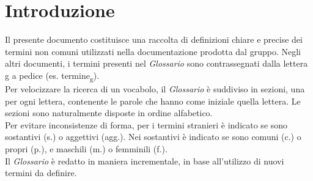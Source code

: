 \section*{Introduzione}
    Il presente documento costituisce una raccolta di definizioni chiare e precise dei termini non
    comuni utilizzati nella documentazione prodotta dal gruppo. Negli altri documenti, i termini
    presenti nel \textit{Glossario} sono contrassegnati dalla lettera g a pedice (es. termine\textsubscript{g}).\\
    Per velocizzare la ricerca di un vocabolo, il \textit{Glossario} è suddiviso in sezioni,
    una per ogni lettera, contenente le parole che hanno come iniziale quella lettera. Le sezioni sono 
    naturalmente disposte in ordine alfabetico.\\
    Per evitare inconsistenze di forma, per i termini stranieri è indicato se sono sostantivi (s.) o aggettivi (agg.).
    Nei sostantivi è indicato se sono comuni (c.) o propri (p.), e maschili (m.) o femminili (f.).\\
    Il \textit{Glossario} è redatto in maniera incrementale, in base all'utilizzo
    di nuovi termini da definire.
